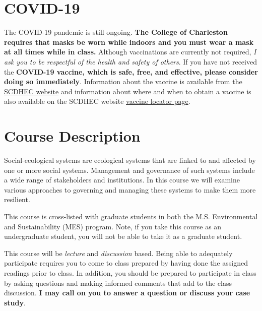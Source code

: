 \hypertarget{covid-19}{%
\section{COVID-19}\label{covid-19}}

The COVID-19 pandemic is still ongoing. \textbf{The College of
Charleston requires that masks be worn while indoors and you must wear a
mask at all times while in class.} Although vaccinations are currently
not required, \emph{I ask you to be respectful of the health and safety
of others}. If you have not received the \textbf{COVID-19 vaccine, which
is safe, free, and effective, please consider doing so immediately}.
Information about the vaccine is available from the
\href{https://scdhec.gov/covid19/covid-19-vaccine}{SCDHEC website} and
information about where and when to obtain a vaccine is also available
on the SCDHEC website \href{https://vaxlocator.dhec.sc.gov/}{vaccine
locator page}.

\hypertarget{course-description}{%
\section{Course Description}\label{course-description}}

Social-ecological systems are ecological systems that are linked to and
affected by one or more social systems. Management and governance of
such systems include a wide range of stakeholders and institutions. In
this course we will examine various approaches to governing and managing
these systems to make them more resilient.

\vspace{0.10in}

\noindent This course is cross-listed with graduate students in both the
M.S. Environmental and Sustainability (MES) program. Note, if you take
this course as an undergraduate student, you will not be able to take it
as a graduate student.

\vspace{0.1in}

\noindent This course will be \emph{lecture} and \emph{discussion}
based. Being able to adequately participate requires you to come to
class prepared by having done the assigned readings prior to class. In
addition, you should be prepared to participate in class by asking
questions and making informed comments that add to the class discussion.
\textbf{I may call on you to answer a question or discuss your case
study}.

